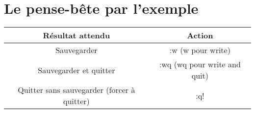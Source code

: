 \chapter{Le pense-bête par l'exemple}
\bigskip
\begin{tabular}[H]{|c|c|}
  \hline
  Résultat attendu & Action\\
  \hline
  Sauvegarder & :w (w pour write)\\
  Sauvegarder et quitter & :wq (wq pour write and quit)\\
  Quitter sans sauvegarder (forcer à quitter) & :q! \\
  \hline
\end{tabular}
\bigskip

